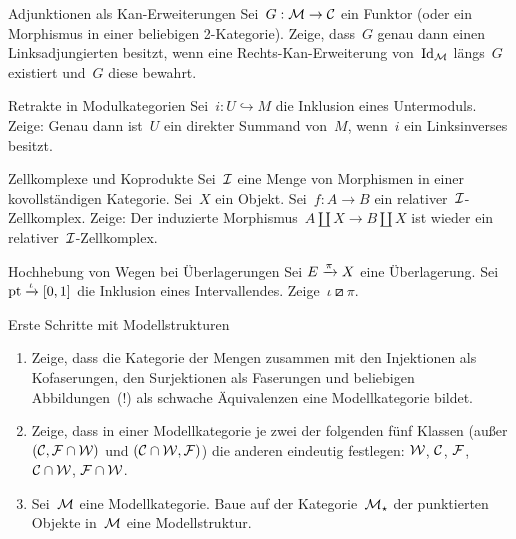 \documentclass{uebblatt}
\begin{document}

\begin{aufgabe}{Adjunktionen als Kan-Erweiterungen}
Sei~$G : \mathcal{M} \to \mathcal{C}$ ein Funktor (oder ein Morphismus in einer beliebigen
2-Kategorie). Zeige, dass~$G$ genau dann einen Linksadjungierten besitzt, wenn
eine Rechts-Kan-Erweiterung von~$\mathrm{Id}_{\mathcal{M}}$ längs~$G$ existiert und~$G$ diese
bewahrt.
\end{aufgabe}

\begin{aufgabe}{Retrakte in Modulkategorien}
Sei~$i : U \hookrightarrow M$ die Inklusion eines Untermoduls. Zeige: Genau
dann ist~$U$ ein direkter Summand von~$M$, wenn~$i$ ein Linksinverses besitzt.
\end{aufgabe}

\begin{aufgabe}{Zellkomplexe und Koprodukte}
Sei~$\mathcal{I}$ eine Menge von Morphismen in einer kovollständigen Kategorie.
Sei~$X$ ein Objekt. Sei~$f : A \to B$ ein relativer~$\mathcal{I}$-Zellkomplex. Zeige: Der
induzierte Morphismus~$A \amalg X \to B \amalg X$ ist wieder ein
relativer~$\mathcal{I}$-Zellkomplex.
\end{aufgabe}

\begin{aufgabe}{Hochhebung von Wegen bei Überlagerungen}
Sei $E \xrightarrow{\pi} X$ eine Überlagerung. Sei~$\mathrm{pt} \xrightarrow{\iota} [0,1]$ die
Inklusion eines Intervallendes. Zeige~$\iota \boxslash \pi$.
\end{aufgabe}
\vspace{-1em}

\begin{aufgabe}{Erste Schritte mit Modellstrukturen}
\begin{enumerate}
\item Zeige, dass die Kategorie der Mengen zusammen mit den Injektionen als
Kofaserungen, den Surjektionen als Faserungen und beliebigen Abbildungen~(!)
als schwache Äquivalenzen eine Modellkategorie bildet.
\item Zeige, dass in einer Modellkategorie je zwei der folgenden fünf Klassen
(außer $(\mathcal{C},\mathcal{F} \cap \mathcal{W})$ und $(\mathcal{C} \cap \mathcal{W},\mathcal{F})$) die anderen eindeutig
festlegen: $\mathcal{W}$, $\mathcal{C}$, $\mathcal{F}$, $\mathcal{C} \cap \mathcal{W}$, $\mathcal{F} \cap \mathcal{W}$.
\item Sei~$\mathcal{M}$ eine Modellkategorie. Baue auf der Kategorie~$\mathcal{M}_\star$ der
punktierten Objekte in~$\mathcal{M}$ eine Modellstruktur.
\end{enumerate}
\end{aufgabe}
\end{document}
